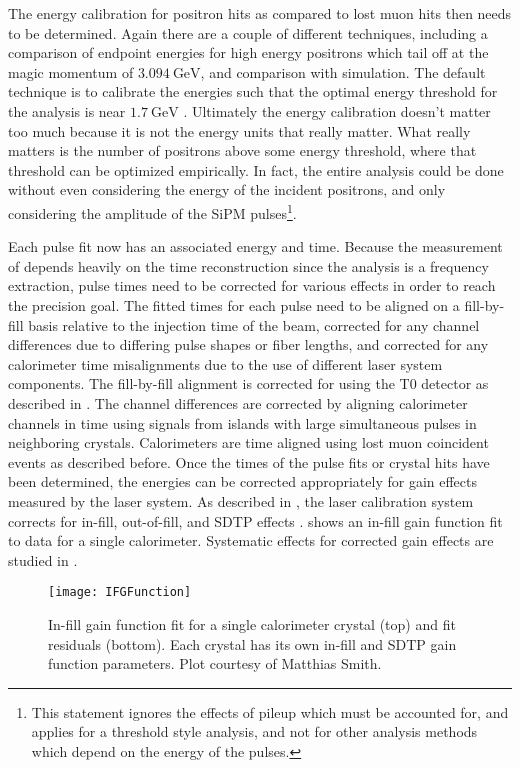 The energy calibration for positron hits as compared to lost muon hits then needs to be determined. Again there are a couple of different techniques, including a comparison of endpoint energies for high energy positrons which tail off at the magic momentum of $\SI{3.094}{\GeV}$, and comparison with simulation. The default technique is to calibrate the energies such that the optimal energy threshold for the \wa analysis is near $\SI{1.7}{\GeV}$ \cite{AFThesis}. Ultimately the energy calibration doesn't matter too much because it is not the energy units that really matter. What really matters is the number of positrons above some energy threshold, where that threshold can be optimized empirically. In fact, the entire \wa analysis could be done without even considering the energy of the incident positrons, and only considering the amplitude of the SiPM pulses\footnote{This statement ignores the effects of pileup which must be accounted for, and applies for a threshold style analysis, and not for other analysis methods which depend on the energy of the pulses.}.


Each pulse fit now has an associated energy and time. Because the measurement of \wa depends heavily on the time reconstruction since the analysis is a frequency extraction, pulse times need to be corrected for various effects in order to reach the precision goal. The fitted times for each pulse need to be aligned on a fill-by-fill basis relative to the injection time of the beam, corrected for any channel differences due to differing pulse shapes or fiber lengths, and corrected for any calorimeter time misalignments due to the use of different laser system components. The fill-by-fill alignment is corrected for using the T0 detector as described in . The channel differences are corrected by aligning calorimeter channels in time using signals from islands with large simultaneous pulses in neighboring crystals. Calorimeters are time aligned using lost muon coincident events as described before. Once the times of the pulse fits or crystal hits have been determined, the energies can be corrected appropriately for gain effects measured by the laser system. As described in , the laser calibration system corrects for in-fill, out-of-fill, and SDTP effects \cite{Gain}.  shows an in-fill gain function fit to data for a single calorimeter. Systematic effects for corrected gain effects are studied in . 

\begin{figure}[]
    \centering
    \texttt{[image: IFGFunction]}
    \caption[In-fill gain function fit for a single calorimeter crystal]{In-fill gain function fit for a single calorimeter crystal (top) and fit residuals (bottom). Each crystal has its own in-fill and SDTP gain function parameters. Plot courtesy of Matthias Smith.}
    \label{fig:IFGFunction}
\end{figure}


